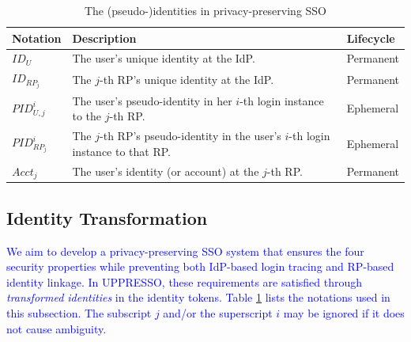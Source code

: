 \begin{table}
\footnotesize
    \caption{The (pseudo-)identities in privacy-preserving SSO}
    \centering
    \begin{tabular}{|p{1.0cm}|p{5.1cm}|p{1.13cm}|} \hline
    {\textbf{Notation}} & {\textbf{Description}} & {\textbf{Lifecycle}} \\ \hline
    {$ID_U$} & {The user's unique identity at the IdP.} & {Permanent} \\ \hline
    {$ID_{RP_j}$} & {The $j$-th RP's unique identity at the IdP.} & {Permanent} \\ \hline
    {$PID_{U,j}^i$} & {The user's pseudo-identity in her $i$-th login instance to the $j$-th RP.} & {Ephemeral} \\ \hline
    {$PID_{RP_j}^i$} & {The $j$-th RP's pseudo-identity in the user's $i$-th login instance to that RP.} & {Ephemeral} \\ \hline
    {$Acct_j$} & {The user's identity (or account) at the $j$-th RP.} & {Permanent} \\ \hline
    \end{tabular}
    \label{tbl:notations-dilemma}
\end{table}

\subsection{Identity Transformation}
\label{subsec:solutions}

\textcolor{blue}{We aim to develop a privacy-preserving SSO system that ensures the four security properties while preventing both IdP-based login tracing and RP-based identity linkage.
In UPPRESSO, these requirements are satisfied through \emph{transformed identities} in the identity tokens. Table \ref{tbl:notations-dilemma} lists the notations used in this subsection. The subscript $j$ and/or the superscript $i$ may be ignored if it does not cause ambiguity.}

